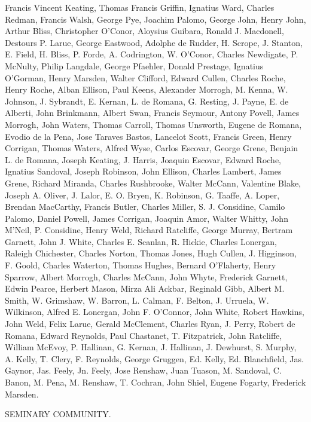 Francis Vincent Keating, Thomas Francis Griffin,
Ignatius Ward, Charles Redman, Francis Walsh, George Pye, Joachim
Palomo, George John, Henry John, Arthur Bliss, Christopher O'Conor,
Aloysius Guibara, Ronald J. Macdonell, Destours P. Larue, George
Eastwood, Adolphe de Rudder, H. Scrope, J. Stanton, E. Field, H.
Bliss, P. Forde, A. Codrington, W. O'Conor, Charles Newdigate, P.
McNulty, Philip Langdale, George Pfaehler, Donald Prestage, Ignatius O'Gorman,
Henry Marsden, Walter Clifford, Edward Cullen, Charles Roche, Henry
Roche, Alban Ellison, Paul Keens, Alexander Morrogh, M. Kenna, W.
Johnson, J. Sybrandt, E. Kernan, L. de Romana, G. Resting, J. Payne,
E. de Alberti, John Brinkmann, Albert Swan, Francis Seymour, Antony
Povell, James Morrogh, John Waters, Thomas Carroll, Thomas Unsworth,
Eugene de Romana, Evodio de la Pena, Jose Taraves Bastos, Lancelot
Scott, Francis Green, Henry Corrigan, Thomas Waters, Alfred Wyse,
Carlos Escovar, George Grene, Benjain L. de Romana, Joseph Keating, J.
Harris, Joaquin Escovar, Edward Roche, Ignatius Sandoval, Joseph
Robinson, John Ellison, Charles Lambert, James Grene, Richard Miranda,
Charles Rushbrooke, Walter McCann, Valentine Blake, Joseph A. Oliver,
J. Lalor, E. O. Bryen, K. Robinson, G. Taaffe, A. Loper, Brendan
MacCarthy, Francis Butler, Charles Miller, S. J. Considine, Camilo
Palomo, Daniel Powell, James Corrigan, Joaquin Amor, Walter Whitty,
John M'Neil, P. Considine, Henry Weld, Richard Ratcliffe, George
Murray, Bertram Garnett, John J. White, Charles E. Scanlan, R. Hickie,
Charles Lonergan, Raleigh Chichester, Charles Norton, Thomas Jones,
Hugh Cullen, J. Higginson, F. Goold, Charles Waterton, Thomas Hughes,
Bernard O'Flaherty, Henry Sparrow, Albert Morrogh, Charles McCann,
John Whyte, Frederick Garnett, Edwin Pearce, Herbert Mason, Mirza Ali
Ackbar, Reginald Gibb, Albert M. Smith, W. Grimshaw, W. Barron, L.
Calman, F. Belton, J. Urruela, W. Wilkinson, Alfred E. Lonergan, John
F. O'Connor, John White, Robert Hawkins, John Weld, Felix Larue,
Gerald McClement, Charles Ryan, J. Perry, Robert de Romana, Edward
Reynolds, Paul Chastanet, T. Fitzpatrick, John Ratcliffe, William
McEvoy, P. Hallinan, G. Kernan, J. Hallinan, J. Dewhurst, S. Murphy,
A. Kelly, T. Clery, F. Reynolds, George Gruggen, Ed. Kelly, Ed.
Blanchfield, Jas. Gaynor, Jas. Feely, Jn. Feely, Jose Renshaw, Juan
Tuason, M. Sandoval, C. Banon, M. Pena, M. Renshaw, T. Cochran, John
Shiel, Eugene Fogarty, Frederick Marsden.

SEMINARY COMMUNITY.

